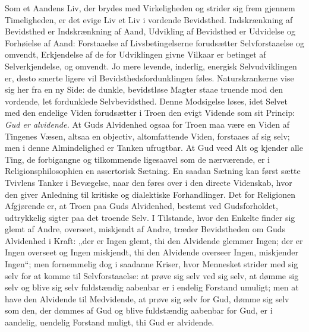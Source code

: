 \documentclass[12pt]{book}
\begin{document}
Som et Aandens Liv, der brydes med Virkeligheden og strider sig frem
gjennem Timeligheden, er det evige Liv et Liv i vordende Bevidsthed.
Indskrænkning af Bevidsthed er Indskrænkning af Aand, Udvikling af
Bevidsthed er Udvidelse og Forhøielse af Aand: Forstaaelse af
Livsbetingelserne forudsætter Selvforstaaelse og omvendt,
Erkjendelse af de for Udviklingen givne Vilkaar er betinget af
Selverkjendelse, og omvendt. Jo mere levende, inderlig, energisk
Selvudviklingen er, desto smerte\-
ligere vil Bevidsthedsfordunklingen føles. Naturskrankerne vise sig
her fra en ny Side: de dunkle, bevidstløse Magter staae truende mod
den vordende, let fordunklede Selvbevidsthed. Denne Modsigelse
løses, idet Selvet med den endelige Viden forudsætter i Troen den
evigt Vidende som sit Princip: \emph{Gud er alvidende.} At Guds
Alvidenhed ogsaa for Troen maa være en Viden af Tingenes Væsen,
altsaa en objectiv, altomfattende Viden, forstaaes af sig selv; men
i denne Almindelighed er Tanken ufrugtbar. At Gud veed Alt og
kjender alle Ting, de forbigangne og tilkommende ligesaavel som de
nærværende, er i Religionsphilosophien en assertorisk Sætning. En
saadan Sætning kan først sætte Tvivlens Tanker i Bevægelse, naar den
føres over i den directe Videnskab, hvor den giver Anledning til
kritiske og dialektiske Forhandlinger. Det for Religionen
Afgjørende er, at Troen paa Guds Alvidenhed, bestemt ved
Gudsforholdet, udtrykkelig sigter paa det troende Selv. I
Tilstande, hvor den Enkelte finder sig glemt af Andre, overseet,
miskjendt af Andre, træder Bevidstheden om Guds Alvidenhed i Kraft:
„der er Ingen glemt, thi den Alvidende glemmer Ingen; der er Ingen
overseet og Ingen miskjendt, thi den Alvidende overseer Ingen,
miskjender Ingen“; men fornemmelig dog i saadanne Kriser, hvor
Mennesket strider med sig selv for at komme til Selvforstaaelse: at
prøve sig selv ved sig selv, at dømme sig selv og blive sig selv
fuldstændig aabenbar er i endelig Forstand umuligt; men at have den
Alvidende til Medvidende, at prøve sig selv for Gud, dømme sig selv
som den, der dømmes af Gud og blive fuldstændig aabenbar for Gud, er
i aandelig, uendelig Forstand muligt, thi Gud er alvidende.
\end{document}
